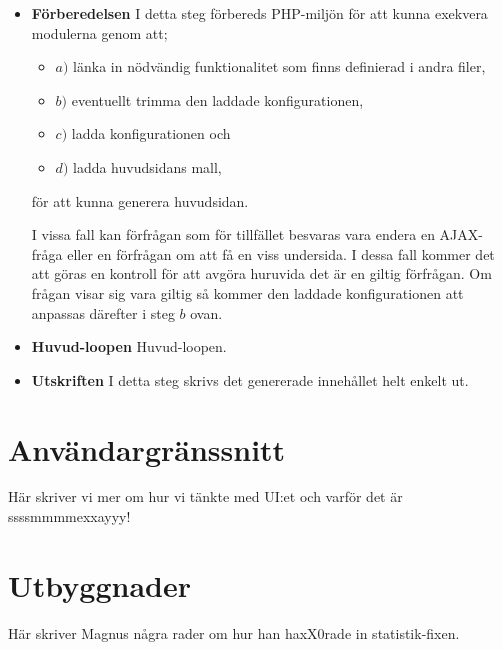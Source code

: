 \begin{itemize}
  \item {\bf Förberedelsen}
    I detta steg förbereds PHP-miljön för att kunna exekvera modulerna
    genom att;

    \begin{itemize}
      \item $a)$ länka in nödvändig funktionalitet som finns definierad
        i andra filer,
      \item $b)$ eventuellt trimma den laddade konfigurationen,
      \item $c)$ ladda konfigurationen och
      \item $d)$ ladda huvudsidans mall,
    \end{itemize}

    för att kunna generera huvudsidan.

    I vissa fall kan förfrågan som för tillfället besvaras vara endera
    en AJAX-fråga eller en förfrågan om att få en viss undersida. I
    dessa fall kommer det att göras en kontroll för att avgöra huruvida
    det är en giltig förfrågan. Om frågan visar sig vara giltig så
    kommer den laddade konfigurationen att anpassas därefter i steg $b$
    ovan.

  \item {\bf Huvud-loopen}
    Huvud-loopen.

  \item {\bf Utskriften}
    I detta steg skrivs det genererade innehållet helt enkelt ut.
\end{itemize}

\section{Användargränssnitt}
\label{sec:ui}
Här skriver vi mer om hur vi tänkte med UI:et och varför det är
ssssmmmmexxayyy!

\section{Utbyggnader}
\label{design:stats}
Här skriver Magnus några rader om hur han haxX0rade in statistik-fixen.
